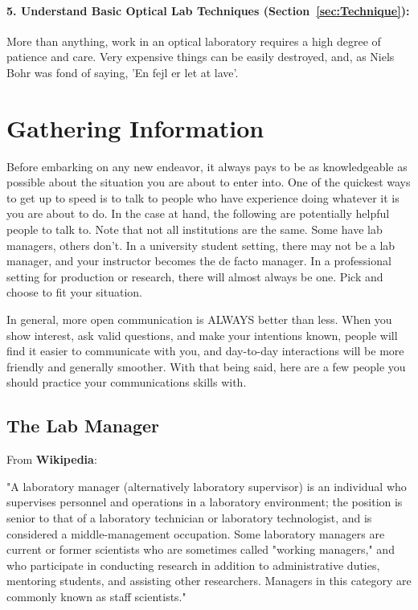 \documentclass[11pt]{article}
\begin{document}
\vspace{-10pt}

\paragraph{5. Understand Basic Optical Lab Techniques (Section~\ref{sec:Technique}):}
More than anything, work in an optical laboratory requires a high degree of patience and care. Very expensive things can be easily destroyed, and, as Niels Bohr was fond of saying, 'En fejl er let at lave'.


\section{Gathering Information}
\label{sec:Information}

Before embarking on any new endeavor, it always pays to be as knowledgeable as possible about the situation you are about to enter into. One of the quickest ways to get up to speed is to talk to people who have experience doing whatever it is you are about to do. In the case at hand, the following are potentially helpful people to talk to. Note that not all institutions are the same. Some have lab managers, others don't. In a university student setting, there may not be a lab manager, and your instructor becomes the de facto manager. In a professional setting for production or research, there will almost always be one. Pick and choose to fit your situation.

In general, more open communication is ALWAYS better than less. When you show interest, ask valid questions, and make your intentions known, people will find it easier to communicate with you, and day-to-day interactions will be more friendly and generally smoother. With that being said, here are a few people you should practice your communications skills with.

\subsection{The Lab Manager}

From \textbf{Wikipedia}: 

"A laboratory manager (alternatively laboratory supervisor) is an individual who supervises personnel and operations in a laboratory environment; the position is senior to that of a laboratory technician or laboratory technologist, and is considered a middle-management occupation. Some laboratory managers are current or former scientists who are sometimes called "working managers," and who participate in conducting research in addition to administrative duties, mentoring students, and assisting other researchers. Managers in this category are commonly known as staff scientists."\cite{website:wikipedia01}
\vspace{0.3cm}
\end{document}
